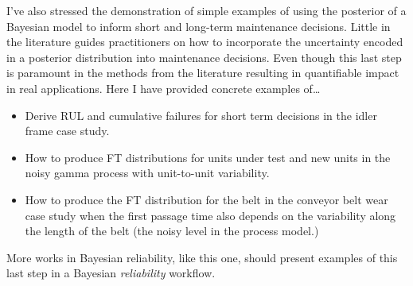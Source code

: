 I've also stressed the demonstration of simple examples of using the posterior of a Bayesian model to inform short and long-term maintenance decisions. Little in the literature guides practitioners on how to incorporate the uncertainty encoded in a posterior distribution into maintenance decisions. Even though this last step is paramount in the methods from the literature resulting in quantifiable impact in real applications. Here I have provided concrete examples of\dots
\begin{itemize}
  \item Derive RUL and cumulative failures for short term decisions in the idler frame case study.
  \item How to produce FT distributions for units under test and new units in the noisy gamma process with unit-to-unit variability.
  \item How to produce the FT distribution for the belt in the conveyor belt wear case study when the first passage time also depends on the variability along the length of the belt (the noisy level in the process model.)
\end{itemize}
More works in Bayesian reliability, like this one, should present examples of this last step in a Bayesian \textit{reliability} workflow.
